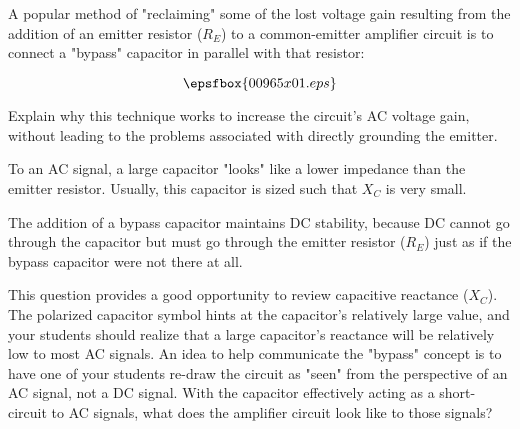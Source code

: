 

A popular method of "reclaiming" some of the lost voltage gain resulting from the addition of an emitter resistor ($R_E$) to a common-emitter amplifier circuit is to connect a "bypass" capacitor in parallel with that resistor:

$$\epsfbox{00965x01.eps}$$

Explain why this technique works to increase the circuit's AC voltage gain, without leading to the problems associated with directly grounding the emitter.







To an AC signal, a large capacitor "looks" like a lower impedance than the emitter resistor.  Usually, this capacitor is sized such that $X_C$ is very small.

The addition of a bypass capacitor maintains DC stability, because DC cannot go through the capacitor but must go through the emitter resistor ($R_E$) just as if the bypass capacitor were not there at all.







This question provides a good opportunity to review capacitive reactance ($X_C$).  The polarized capacitor symbol hints at the capacitor's relatively large value, and your students should realize that a large capacitor's reactance will be relatively low to most AC signals.  An idea to help communicate the "bypass" concept is to have one of your students re-draw the circuit as "seen" from the perspective of an AC signal, not a DC signal.  With the capacitor effectively acting as a short-circuit to AC signals, what does the amplifier circuit look like to those signals?




